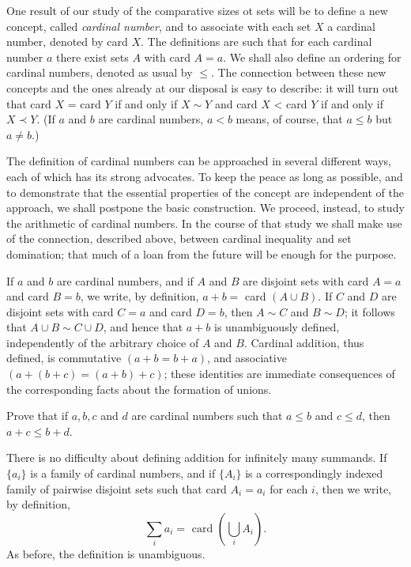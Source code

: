 
One result of our study of the comparative sizes ot sets will be to define a new concept, called \textit{cardinal number}, and to associate with each set $X$ a cardinal number, denoted by card $X$. The definitions are such that for each cardinal number $a$ there exist sets $A$ with card $A = a$. We shall also define an ordering for cardinal numbers, denoted as usual by $\le$. The connection between these new concepts and the ones already at our disposal is easy to describe: it will turn out that card $X$ = card $Y$ if and only if $X \sim Y$ and card $X$ < card $Y$ if and only if $X \prec Y$. (If $a$ and $b$ are cardinal numbers, $a < b$ means, of course, that $a \le b$ but $a \neq b$.)

The definition of cardinal numbers can be approached in several different ways, each of which has its strong advocates. To keep the peace as long as possible, and to demonstrate that the essential properties of the concept are independent of the approach, we shall postpone the basic construction. We proceed, instead, to study the arithmetic of cardinal numbers. In the course of that study we shall make use of the connection, described above, between cardinal inequality and set domination; that much of a loan from the future will be enough for the purpose.

If $a$ and $b$ are cardinal numbers, and if $A$ and $B$ are disjoint sets with card $A = a$ and card $B = b$, we write, by definition, $a + b =$ card $(A \cup B)$. If $C$ and $D$ are disjoint sets with card $C = a$ and card $D = b$, then $A \sim C$ and $B \sim D$; it follows that $A \cup B \sim C \cup D$, and hence that $a + b$ is unambiguously defined, independently of the arbitrary choice of $A$ and $B$. Cardinal addition, thus defined, is commutative $(a + b = b + a)$, and associative $(a + (b + c) = (a + b) + c)$; these identities are immediate consequences of the corresponding facts about the formation of unions.

\begin{exercise} Prove that if $a, b, c$ and $d$ are cardinal numbers such that $a \le b$ and $c \le d$, then $a + c \le b + d$. 
\end{exercise}

There is no difficulty about defining addition for infinitely many summands. If $\{ a_{i} \}$ is a family of cardinal numbers, and if $\{ A_{i} \}$ is a correspondingly indexed family of pairwise disjoint sets such that card $A_{i} = a_{i}$ for each $i$, then we write, by definition,
\begin{equation*}
\sum_{i} a_{i} = \text{ card } (\bigcup_{i} A_{i} ).
\end{equation*}
As before, the definition is unambiguous.

